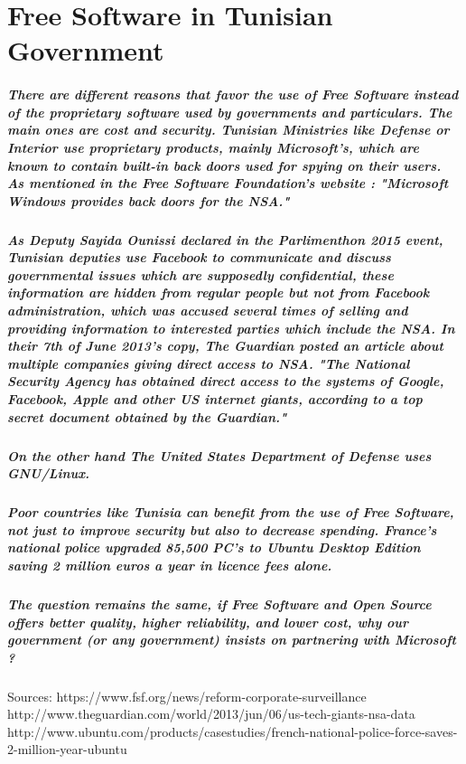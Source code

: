 \chapter{Free Software in Tunisian Government}
\paragraph*{There are different reasons that favor the use of Free Software instead of the proprietary software used by governments and particulars. The main ones are cost and security.
Tunisian Ministries like Defense or Interior use proprietary products, mainly Microsoft's, which are known to contain built-in back doors used for spying on their users. As mentioned in the Free Software Foundation's website : "Microsoft Windows provides back doors for the NSA."}
\paragraph*{As Deputy Sayida Ounissi declared in the Parlimenthon 2015 event, Tunisian deputies use Facebook to communicate and discuss governmental issues which are supposedly confidential, these information are hidden from regular people but not from Facebook administration, which was accused several times of selling and providing information to interested parties which include the NSA. In their 7th of June 2013's copy, The Guardian posted an article about multiple companies giving direct access to NSA. "The National Security Agency has obtained direct access to the systems of Google, Facebook, Apple and other US internet giants, according to a top secret document obtained by the Guardian."}
\paragraph*{On the other hand The United States Department of Defense uses GNU/Linux.}
\paragraph*{Poor countries like Tunisia can benefit from the use of Free Software, not just to improve security but also to decrease spending.
France's national police upgraded 85,500 PC's to Ubuntu Desktop Edition saving 2 million euros a year in licence fees alone.}
\paragraph*{The question remains the same, if Free Software and Open Source offers better quality, higher reliability, and lower cost, why our government (or any government) insists on partnering with Microsoft ?}




Sources:
https://www.fsf.org/news/reform-corporate-surveillance
http://www.theguardian.com/world/2013/jun/06/us-tech-giants-nsa-data
http://www.ubuntu.com/products/casestudies/french-national-police-force-saves-2-million-year-ubuntu